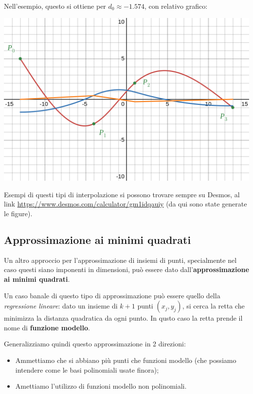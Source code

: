 \documentclass[a4paper,11pt]{article}
\begin{document}
\begin{itemize}
		\begin{minipage}{\textwidth}
		Nell'esempio, questo si ottiene per $d_0 \approx -1.574$, con relativo grafico:
		\begin{center}
			\includegraphics[scale=0.3]{../figures/multipoly_nat.png}
		\end{center}
		\end{minipage}
\end{itemize}

Esempi di questi tipi di interpolazione si possono trovare sempre su Desmos, al link \url{https://www.desmos.com/calculator/gm1idqauiy} (da qui sono state generate le figure).

\subsection{Approssimazione ai minimi quadrati}
Un altro approccio per l'approssimazione di insiemi di punti, specialmente nel caso questi siano imponenti in dimensioni, può essere dato dall'\textbf{approssimazione ai minimi quadrati}.

Un caso banale di questo tipo di approssimazione può essere quello della \textit{regressione lineare}: dato un insieme di $k + 1$ punti $(x_j, y_j)$, si cerca la retta che minimizza la distanza quadratica da ogni punto.
In qusto caso la retta prende il nome di \textbf{funzione modello}.

Generalizziamo quindi questo approssimazione in 2 direzioni:
\begin{itemize}
	\item Ammettiamo che si abbiano più punti che funzioni modello (che possiamo intendere come le basi polinomiali usate finora);
	\item Amettiamo l'utilizzo di funzioni modello non polinomiali.
\end{itemize}
\end{document}
